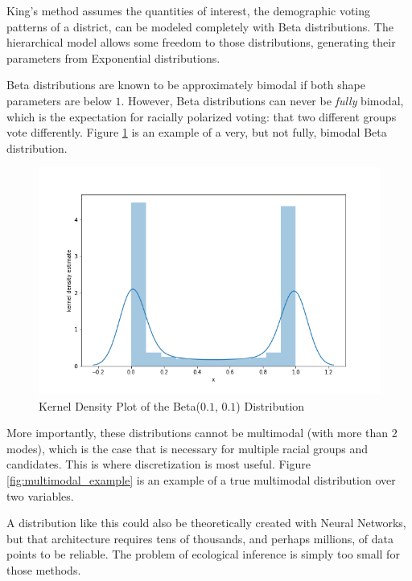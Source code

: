 \documentclass[fleqn,10pt]{style}
\begin{document}
King's method assumes the quantities of interest, the demographic voting patterns of a district, can be modeled completely with Beta distributions. The hierarchical model allows some freedom to those distributions, generating their parameters from Exponential distributions.

Beta distributions are known to be approximately bimodal if both shape parameters are below $1$. However, Beta distributions can never be \textit{fully} bimodal, which is the expectation for racially polarized voting: that two different groups vote differently. Figure \ref{fig:beta_example} is an example of a very, but not fully, bimodal Beta distribution.

\begin{figure}[ht]\centering
 \includegraphics[width=\linewidth]{images/beta_example.png}
 \caption{Kernel Density Plot of the Beta($0.1$, $0.1$) Distribution}
 \label{fig:beta_example}
\end{figure}

More importantly, these distributions cannot be multimodal (with more than $2$ modes), which is the case that is necessary for multiple racial groups and candidates. This is where discretization is most useful. Figure \ref{fig:multimodal_example} is an example of a true multimodal distribution over two variables.

A distribution like this could also be theoretically created with Neural Networks, but that architecture requires tens of thousands, and perhaps millions, of data points to be reliable. The problem of ecological inference is simply too small for those methods.
\end{document}
